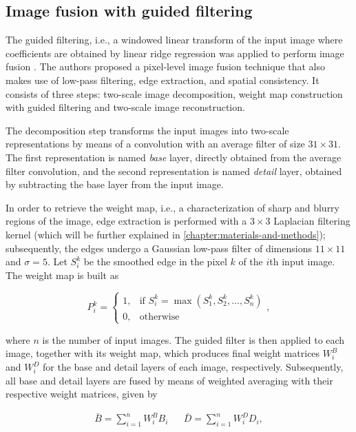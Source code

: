 \subsection{Image fusion with guided filtering}

The guided filtering, i.e., a windowed linear transform of the input image where coefficients are obtained by linear ridge regression was applied to perform image fusion \cite{li2013image}. The authors proposed a pixel-level image fusion technique that also makes use of low-pass filtering, edge extraction, and spatial consistency. It consists of three steps: two-scale image decomposition, weight map construction with guided filtering and two-scale image reconstruction.

The decomposition step transforms the input images into two-scale representations by means of a convolution with an average filter of size $31 \times 31$. The first representation is named \emph{base} layer, directly obtained from the average filter convolution, and the second representation is named \emph{detail} layer, obtained by subtracting the base layer from the input image.

In order to retrieve the weight map, i.e., a characterization of sharp and blurry regions of the image, edge extraction is performed with a $3 \times 3$ Laplacian filtering kernel (which will be further explained in \autoref{chapter:materials-and-methods}); subsequently, the edges undergo a Gaussian low-pass filter of dimensions $11 \times 11$ and $\sigma = 5$. Let $S_{i}^{k}$ be the smoothed edge in the pixel $k$ of the $i$th input image. The weight map is built as

\begin{equation}
\label{eqn:weight_map}
P_{i}^{k} = 
    \begin{cases}
        1, & \text{if } S_{i}^{k} = \max{(S_{1}^{k},S_{2}^{k},\dots,S_{n}^{k})}\\
        0, & \text{otherwise}
    \end{cases},
\end{equation}

\noindent where $n$ is the number of input images. The guided filter is then applied to each image, together with its weight map, which produces final weight matrices $W_{i}^{B}$ and $W_{i}^{D}$ for the base and detail layers of each image, respectively. Subsequently, all base and detail layers are fused by means of weighted averaging with their respective weight matrices, given by

\begin{align}
\bar{B} = \sum_{i=1}^{n}W_{i}^{B}B_{i}
&&
\bar{D} = \sum_{i=1}^{n}W_{i}^{D}D_{i},
\end{align}

